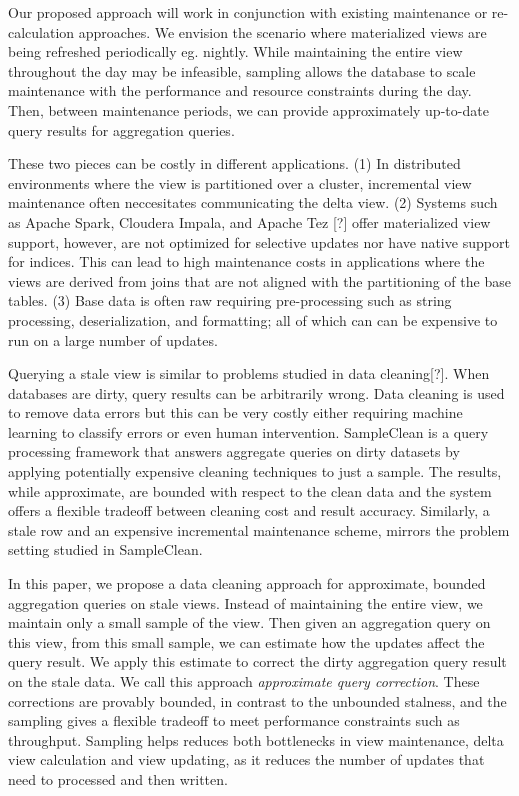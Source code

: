 \vspace{1em}

Our proposed approach will work in conjunction with existing maintenance or re-calculation approaches.
We envision the scenario where materialized views are being refreshed periodically eg. nightly.
While maintaining the entire view throughout the day may be infeasible, sampling allows the database to scale maintenance with the performance and resource constraints during the day.
Then, between maintenance periods, we can provide approximately up-to-date query results for aggregation queries.









\iffalse
 These two pieces can be costly in different
applications. (1) In distributed environments where the view is partitioned
over a cluster, incremental view maintenance often neccesitates communicating
the delta view. (2) Systems such as Apache Spark, Cloudera Impala,
and Apache Tez {[}?{]} offer materialized view support, however, are
not optimized for selective updates nor have native support for indices.
This can lead to high maintenance costs in applications where the
views are derived from joins that are not aligned with the partitioning
of the base tables. (3) Base data is often raw requiring pre-processing
such as string processing, deserialization, and formatting; all of
which can can be expensive to run on a large number of updates. 



Querying a stale view is similar to problems studied in data cleaning{[}?{]}.
When databases are dirty, query results can be arbitrarily wrong.
Data cleaning is used to remove data errors but this can be very costly either 
requiring machine learning to classify errors or even human intervention.
SampleClean is a query processing framework that answers aggregate
queries on dirty datasets by applying potentially expensive cleaning
techniques to just a sample. The results, while approximate, are bounded
with respect to the clean data and the system offers a flexible tradeoff
between cleaning cost and result accuracy. Similarly, a stale row
and an expensive incremental maintenance scheme, mirrors the problem
setting studied in SampleClean. 

In this paper, we propose a data cleaning approach for approximate,
bounded aggregation queries on stale views. Instead of maintaining
the entire view, we maintain only a small sample of the view. Then
given an aggregation query on this view, from this small sample, we
can estimate how the updates affect the query result. We apply this
estimate to correct the dirty aggregation query result on the stale
data. We call this approach \emph{approximate query correction}. 
These corrections are provably bounded, in contrast to the unbounded stalness,
and the sampling gives a flexible tradeoff to meet performance constraints such as throughput.
Sampling helps reduces both bottlenecks in view maintenance, delta
view calculation and view updating, as it reduces the number of updates
that need to processed and then written.

